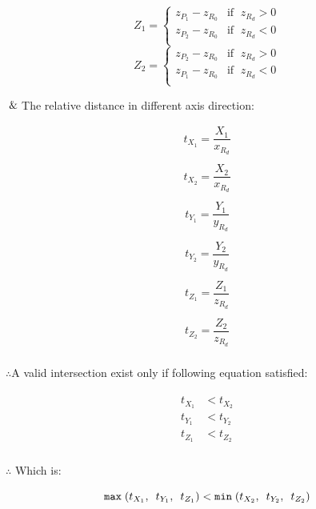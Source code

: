 \begin{multicols}{2}
\noindent
	\[
	Z_1 =
	\begin{cases}
	z_{P_1} - z_{R_0} & \text{if }\;z_{R_d} > 0\\
	z_{P_2} - z_{R_0} & \text{if }\;z_{R_d} < 0\\
	\end{cases}
	\]
\columnbreak
	\[
	Z_2 =
	\begin{cases}
	z_{P_2} - z_{R_0} & \text{if }\;z_{R_d} > 0\\
	z_{P_1} - z_{R_0} & \text{if }\;z_{R_d} < 0\\
	\end{cases}
	\]
\end{multicols}

$\And$\;\;\;\;The relative distance in different axis direction:

\begin{multicols}{3}
\noindent
	\[
	\begin{array}{lr}
	t_{X_1} = \dfrac{X_1}{x_{R_d}}\\\\
	t_{X_2} = \dfrac{X_2}{x_{R_d}}\\
	\end{array}
	\]
\columnbreak
	\[
	\begin{array}{lr}
	t_{Y_1} = \dfrac{Y_1}{y_{R_d}}\\\\
	t_{Y_2} = \dfrac{Y_2}{y_{R_d}}\\
	\end{array}
	\]
\columnbreak
	\[
	\begin{array}{lr}
	t_{Z_1} = \dfrac{Z_1}{z_{R_d}}\\\\
	t_{Z_2} = \dfrac{Z_2}{z_{R_d}}\\
	\end{array}
	\]
\end{multicols}

$\therefore$\;\;\;\;A valid intersection exist only if following equation satisfied:

\[
\begin{array}{lr}
\begin{aligned}
t_{X_1} &< t_{X_2}\\
t_{Y_1} &< t_{Y_2}\\
t_{Z_1} &< t_{Z_2}\\
\end{aligned}
\end{array}
\]

$\therefore$ Which is:

\begin{equation}
\label{equ:ray-box-3d-intersection}
\texttt{max}\;(t_{X_1},\enspace t_{Y_1},\enspace t_{Z_1}) < \texttt{min}\;(t_{X_2},\enspace t_{Y_2},\enspace t_{Z_2})
\end{equation}

